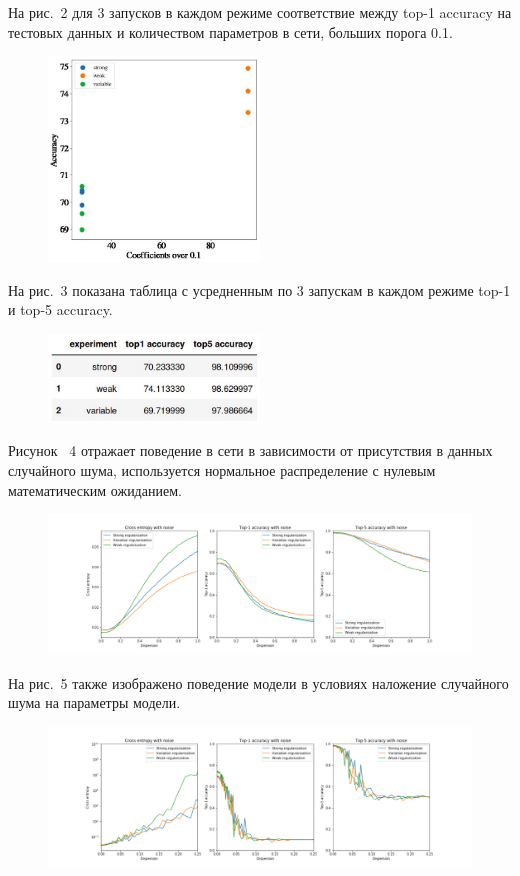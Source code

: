 \documentclass[12pt,twoside]{article}
\begin{document}
На рис.~2 для 3 запусков в каждом режиме соответствие между top-1 accuracy на тестовых данных и количеством параметров в сети, больших порога 0.1.

\begin{figure}[!htbp]
	\centering
	\includegraphics[width=0.5\textwidth]{pic/accuracy.jpeg}
	\caption{}
	\label{}
\end{figure}

На рис.~3 показана таблица с усредненным по 3 запускам в каждом режиме top-1 и top-5 accuracy.

\begin{figure}[!htbp]
	\centering
	\includegraphics[width=0.5\textwidth]{pic/accuracy_table.jpeg}
	\caption{}
	\label{}
\end{figure}

Рисунок ~4 отражает поведение в сети в зависимости от присутствия в данных случайного шума, используется нормальное распределение с нулевым математическим ожиданием.
\begin{figure}[htbp]
	\centering
    \includegraphics[width=1\linewidth]{pic/noise1_graph.pdf}
	\caption{}
	\label{}
\end{figure}

На рис.~5 также изображено поведение модели в условиях наложение случайного шума на параметры модели.
\begin{figure}[htbp]
	\centering
	\includegraphics[width=1\linewidth]{pic/noise_params_graph.pdf}
	\caption{}
	\label{}
\end{figure}




\end{document}
